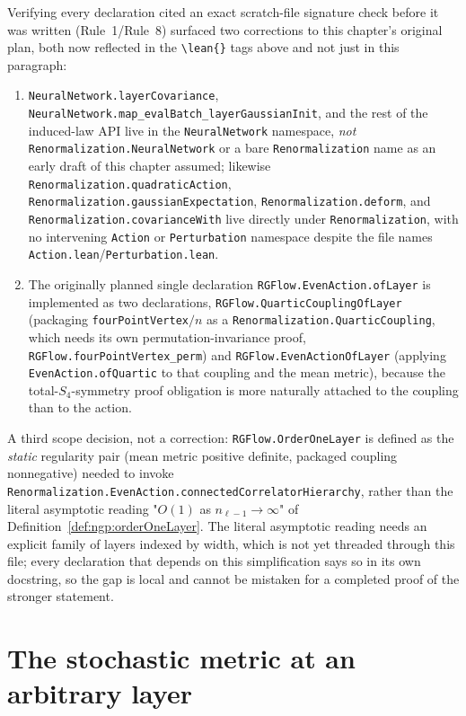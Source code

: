 Verifying every declaration cited an exact scratch-file signature check before it was written
(Rule~1/Rule~8) surfaced two corrections to this chapter's original plan, both now reflected in the
\texttt{\textbackslash lean\{\}} tags above and not just in this paragraph:
\begin{enumerate}
  \item \texttt{NeuralNetwork.layerCovariance}, \texttt{NeuralNetwork.map\_evalBatch\_layerGaussianInit},
    and the rest of the induced-law API live in the \texttt{NeuralNetwork} namespace, \emph{not}
    \texttt{Renormalization.NeuralNetwork} or a bare \texttt{Renormalization} name as an early
    draft of this chapter assumed; likewise \texttt{Renormalization.quadraticAction},
    \texttt{Renormalization.gaussianExpectation}, \texttt{Renormalization.deform}, and
    \texttt{Renormalization.covarianceWith} live directly under \texttt{Renormalization}, with no
    intervening \texttt{Action} or \texttt{Perturbation} namespace despite the file names
    \texttt{Action.lean}/\texttt{Perturbation.lean}.
  \item The originally planned single declaration \texttt{RGFlow.EvenAction.ofLayer} is
    implemented as two declarations, \texttt{RGFlow.QuarticCouplingOfLayer} (packaging
    \texttt{fourPointVertex}$/n$ as a \texttt{Renormalization.QuarticCoupling}, which needs its own
    permutation-invariance proof, \texttt{RGFlow.fourPointVertex\_perm}) and
    \texttt{RGFlow.EvenActionOfLayer} (applying \texttt{EvenAction.ofQuartic} to that coupling and
    the mean metric), because the total-$S_4$-symmetry proof obligation is more naturally attached
    to the coupling than to the action.
\end{enumerate}
A third scope decision, not a correction: \texttt{RGFlow.OrderOneLayer} is defined as the
\emph{static} regularity pair (mean metric positive definite, packaged coupling nonnegative)
needed to invoke \texttt{Renormalization.EvenAction.connectedCorrelatorHierarchy}, rather than the
literal asymptotic reading "$O(1)$ as $n_{\ell-1}\to\infty$" of
Definition~\ref{def:ngp:orderOneLayer}. The literal asymptotic reading needs an explicit family of
layers indexed by width, which is not yet threaded through this file; every declaration that
depends on this simplification says so in its own docstring, so the gap is local and cannot be
mistaken for a completed proof of the stronger statement.

\section{The stochastic metric at an arbitrary layer}
\label{sec:ngp:metric}

